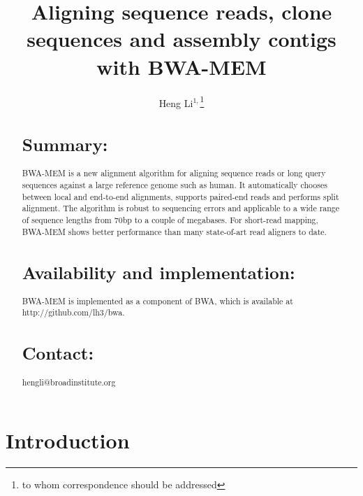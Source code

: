 \documentclass{bioinfo}
\begin{document}

\title{Aligning sequence reads, clone sequences and assembly contigs with BWA-MEM}

\author[Li]{Heng Li$^{1,}$\footnote{to whom correspondence should be addressed}}

\address{$^1$Broad Institute, 7 Cambridge Center, Cambridge, MA 02142, USA}

\maketitle

\begin{abstract}
\section{Summary:} BWA-MEM is a new alignment algorithm for aligning sequence
reads or long query sequences against a large reference genome such as human.
It automatically chooses between local and end-to-end alignments, supports
paired-end reads and performs split alignment. The algorithm is robust to
sequencing errors and applicable to a wide range of sequence lengths from 70bp
to a couple of megabases. For short-read mapping, BWA-MEM shows better
performance than many state-of-art read aligners to date.

\section{Availability and implementation:} BWA-MEM is implemented as a
component of BWA, which is available at http://github.com/lh3/bwa.

\section{Contact:} hengli@broadinstitute.org
\end{abstract}

\section{Introduction}
\end{document}
